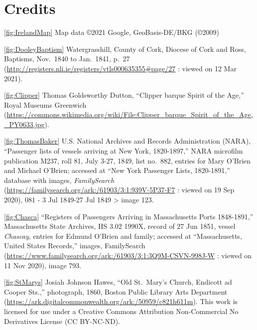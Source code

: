 
\chapter{Credits}
\raggedright
\nonzeroparskip
\small

\ref{fig:IrelandMap} Map data \copyright 2021 Google, GeoBasis-DE/BKG (\copyright 2009)

\ref{fig:DooleyBaptism} Watergrasshill, County of Cork, Diocese of Cork and Ross, Baptisms, Nov.\ 1840 to Jan.\ 1841, p.\ 27 (\url{http://registers.nli.ie/registers/vtls000635355\#page/27} : viewed on 12 Mar 2021).

\ref{fig:Clipper} Thomas Goldsworthy Dutton, ``Clipper barque Spirit of the Age,'' Royal Museums Greenwich (\url{https://commons.wikimedia.org/wiki/File:Clipper_barque_Spirit_of_the_Age,_PY0633.jpg}).

\ref{fig:ThomasBaker} U.S. National Archives and Records Administration (NARA), ``Passenger lists of vessels arriving at New York, 1820-1897,'' NARA microfilm publication M237, roll 81, July 3-27, 1849, list no.\ 882, entries for Mary O'Brien and Michael O'Brien; accessed at ``New York Passenger Lists, 1820-1891,'' database with images, \textit{FamilySearch} (\url{https://familysearch.org/ark:/61903/3:1:939V-5P37-F7} : viewed on 19 Sep 2020), 081 - 3 Jul 1849-27 Jul 1849 > image 123.

\ref{fig:Chasca} ``Registers of Passengers Arriving in Massachusetts Ports 1848-1891,'' Massachusetts State Archives, HS 3.02 1990X, record of 27 Jun 1851, vessel \textit{Chascay}, entries for Edmund O'Brien and family; accessed at ``Massachusetts, United States Records,'' images, FamilySearch (\url{https://www.familysearch.org/ark:/61903/3:1:3Q9M-CSVN-998J-W} : viewed on 11 Nov 2020), image 793.


\ref{fig:StMarys} Josiah Johnson Hawes, ``Old St.\ Mary's Church, Endicott ad Cooper Sts.,'' photograph, 1860, Boston Public Library Arts Department (\url{https://ark.digitalcommonwealth.org/ark:/50959/c821h611m}). This work is licensed for use under a Creative Commons Attribution Non-Commercial No Derivatives License (CC BY-NC-ND).

